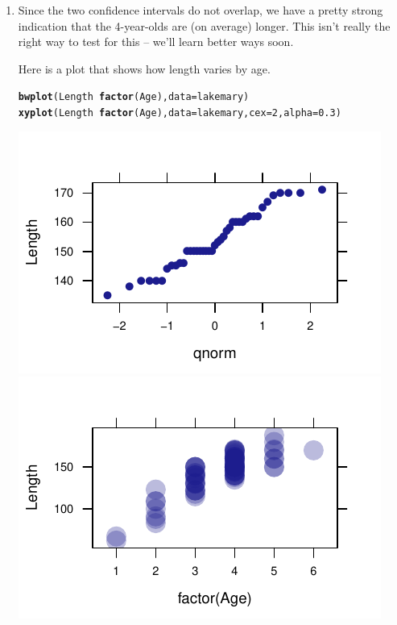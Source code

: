\documentclass[twoside]{book}\usepackage[]{graphicx}\usepackage[]{xcolor}
\makeatletter
\def\maxwidth{ %
  \ifdim\Gin@nat@width>\linewidth
    \linewidth
  \else
    \Gin@nat@width
  \fi
}
\newcommand{\hlnum}[1]{\textcolor[rgb]{0.686,0.059,0.569}{#1}}%
\newcommand{\hlopt}[1]{\textcolor[rgb]{0,0,0}{#1}}%
\newcommand{\hlstd}[1]{\textcolor[rgb]{0.345,0.345,0.345}{#1}}%
\newcommand{\hlkwc}[1]{\textcolor[rgb]{0.333,0.667,0.333}{#1}}%
\newcommand{\hlkwd}[1]{\textcolor[rgb]{0.737,0.353,0.396}{\textbf{#1}}}%
\newenvironment{kframe}{%
 \def\at@end@of@kframe{}%
 \ifinner\ifhmode%
  \def\at@end@of@kframe{\end{minipage}}%
  \begin{minipage}{\columnwidth}%
 \fi\fi%
 \def\FrameCommand##1{\hskip\@totalleftmargin \hskip-\fboxsep
 \colorbox{shadecolor}{##1}\hskip-\fboxsep
     \hskip-\linewidth \hskip-\@totalleftmargin \hskip\columnwidth}%
 \MakeFramed {\advance\hsize-\width
   \@totalleftmargin\z@ \linewidth\hsize
   \@setminipage}}%
 {\par\unskip\endMakeFramed%
 \at@end@of@kframe}
\newenvironment{knitrout}{}{} %
\makeatother
\begin{document}
\begin{solution}
\begin{enumerate}
\begin{knitrout}
{}



\end{knitrout}
	\item
		Since the two confidence intervals do not overlap, we have a pretty strong
		indication that the 4-year-olds are (on average) longer.  This isn't really
		the right way to test for this -- we'll learn better ways soon.

		Here is a plot that shows how length varies by age.
\begin{knitrout}
\color{fgcolor}\begin{kframe}
\begin{alltt}
\hlkwd{bwplot}\hlstd{(Length} \hlopt{~} \hlkwd{factor}\hlstd{(Age),} \hlkwc{data} \hlstd{= lakemary)}
\hlkwd{xyplot}\hlstd{(Length} \hlopt{~} \hlkwd{factor}\hlstd{(Age),} \hlkwc{data} \hlstd{= lakemary,} \hlkwc{cex} \hlstd{=} \hlnum{2}\hlstd{,} \hlkwc{alpha} \hlstd{=} \hlnum{0.3}\hlstd{)}
\end{alltt}
\end{kframe}

{\centering \includegraphics[width=\maxwidth]{figures/fig-unnamed-chunk-151-1} 
\includegraphics[width=\maxwidth]{figures/fig-unnamed-chunk-151-2} 

}



\end{knitrout}
\end{enumerate}
\end{solution}
\end{document}

